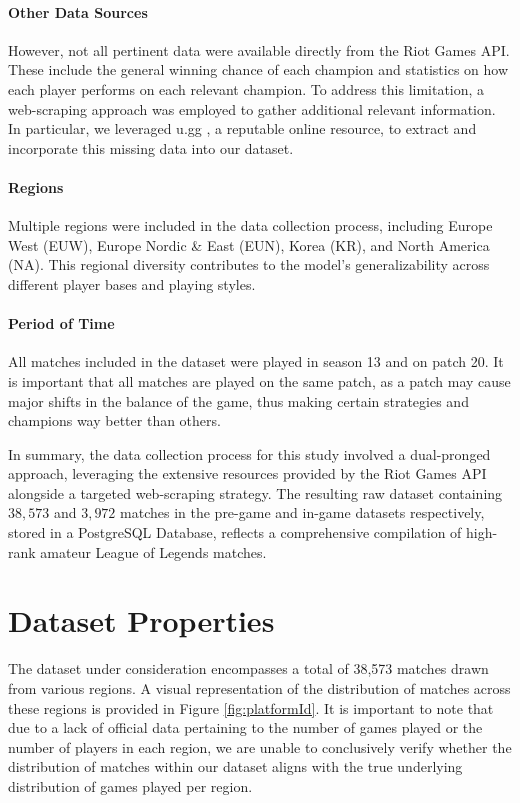 \documentclass[12pt, a4paper, headinclude, twoside, plainheadsepline, open=right, numbers=noenddot, hidelinks, toc=listof, toc=bibliography]{scrreprt}
\begin{document}
\paragraph{Other Data Sources}
However, not all pertinent data were available directly from the Riot Games API.
These include the general winning chance of each champion and statistics on how each player performs on each relevant champion.
To address this limitation, a web-scraping approach was employed to gather additional relevant information. 
In particular, we leveraged u.gg \cite{GGBestLeague}, a reputable online resource, to extract and incorporate this missing data into our dataset. 
\paragraph{Regions}
Multiple regions were included in the data collection process, including Europe West (EUW), Europe Nordic \& East (EUN), Korea (KR), and North America (NA).
This regional diversity contributes to the model's generalizability across different player bases and playing styles.
\paragraph{Period of Time}
All matches included in the dataset were played in season 13 and on patch 20.
It is important that all matches are played on the same patch, as a patch may cause major shifts in the balance of the game, thus making certain strategies and champions way better than others.

In summary, the data collection process for this study involved a dual-pronged approach, leveraging the extensive resources provided by the Riot Games API alongside a targeted web-scraping strategy.
The resulting raw dataset containing $38,573$ and  $3,972$ matches in the pre-game and in-game datasets respectively, stored in a PostgreSQL Database, reflects a comprehensive compilation of high-rank amateur League of Legends matches.

\section{Dataset Properties}
\label{sec:dataprop}

The dataset under consideration encompasses a total of 38,573 matches drawn from various regions. 
A visual representation of the distribution of matches across these regions is provided in Figure \ref{fig:platformId}.
It is important to note that due to a lack of official data pertaining to the number of games played or the number of players in each region, we are unable to conclusively verify whether the distribution of matches within our dataset aligns with the true underlying distribution of games played per region.
\end{document}
